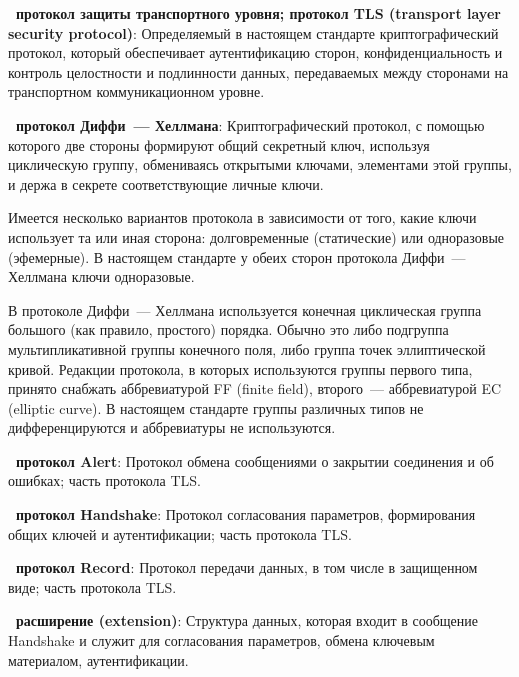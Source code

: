 {\bf \thedefctr~протокол защиты транспортного уровня; протокол TLS 
(transport layer security protocol)}: 
Определяемый в настоящем стандарте криптографический протокол, который
обеспечивает аутентификацию сторон, конфиденциальность и контроль целостности и
подлинности данных, передаваемых между сторонами на транспортном
коммуникационном уровне.

{\bf \thedefctr~протокол Диффи~--- Хеллмана}:
Криптографический протокол, с помощью которого две стороны формируют 
общий секретный ключ, используя циклическую группу, обмениваясь открытыми 
ключами, элементами этой группы, и держа в секрете соответствующие личные 
ключи.

\begin{note}
Имеется несколько вариантов протокола в зависимости от того, какие ключи 
использует та или иная сторона: долговременные (статические) или 
одноразовые (эфемерные). В настоящем стандарте у обеих сторон протокола 
Диффи~--- Хеллмана ключи одноразовые.
\end{note}

\begin{note}
В протоколе Диффи~--- Хеллмана используется конечная циклическая группа большого
(как правило, простого) порядка. Обычно это либо подгруппа мультипликативной
группы конечного поля, либо группа точек эллиптической кривой.
%
Редакции протокола, в которых используются группы первого типа, принято снабжать
аббревиатурой FF (finite field), второго~--- аббревиатурой EC (elliptic curve).
%
В настоящем стандарте группы различных типов не дифференцируются и аббревиатуры 
не используются.
\end{note}

{\bf \thedefctr~протокол Alert}:
Протокол обмена сообщениями о закрытии соединения и об ошибках;
часть протокола TLS.

{\bf \thedefctr~протокол Handshake}:
Протокол согласования параметров, формирования общих ключей и аутентификации; 
часть протокола TLS.


{\bf \thedefctr~протокол Record}:
Протокол передачи данных, в том числе в защищенном виде; 
часть протокола TLS.

{\bf \thedefctr~расширение (extension)}:
Структура данных, которая входит в сообщение Handshake и служит для 
согласования параметров, обмена ключевым материалом, аутентификации.

